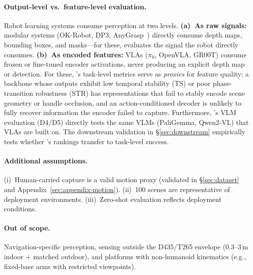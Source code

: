 \paragraph{Output-level vs.\ feature-level evaluation.}
Robot learning systems consume perception at two levels.
\textbf{(a)~As raw signals:} modular systems (OK-Robot, DP3, AnyGrasp~\citep{liu2024okrobot, ze2024dp3}) directly consume depth maps, bounding boxes, and masks---for these, \coolname{} evaluates the signal the robot directly consumes.
\textbf{(b)~As encoded features:} VLAs ($\pi_0$, OpenVLA, GR00T) consume frozen or fine-tuned encoder activations, never producing an explicit depth map or detection.
For these, \coolname{}'s task-level metrics serve as \textit{proxies} for feature quality: a backbone whose outputs exhibit low temporal stability (TS) or poor phase-transition robustness (STR) has representations that fail to stably encode scene geometry or handle occlusion, and an action-conditioned decoder is unlikely to fully recover information the encoder failed to capture.
Furthermore, \coolname{}'s VLM evaluation (D4/D5) directly tests the same VLMs (PaliGemma, Qwen2-VL) that VLAs are built on.
The downstream validation in \S\ref{sec:downstream} empirically tests whether \coolname{}'s rankings transfer to task-level success.

\paragraph{Additional assumptions.}
(i)~Human-carried capture is a valid motion proxy (validated in \S\ref{sec:dataset} and Appendix~\ref{sec:appendix-motion}).
(ii)~100 scenes are representative of deployment environments.
(iii)~Zero-shot evaluation reflects deployment conditions.

\paragraph{Out of scope.}
Navigation-specific perception, sensing outside the D435/T265 envelope (0.3--3\,m indoor + matched outdoor), and platforms with non-humanoid kinematics (e.g., fixed-base arms with restricted viewpoints).

